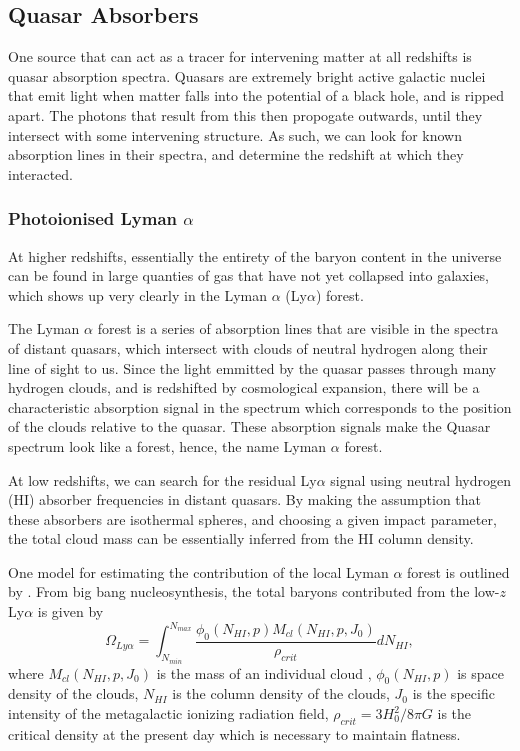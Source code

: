 \subsection{Quasar Absorbers}
One source that can act as a tracer for intervening matter at all redshifts is quasar absorption spectra. Quasars are extremely bright active galactic nuclei that emit light when matter falls into the potential of a black hole, and is ripped apart. The photons that result from this then propogate outwards, until they intersect with some intervening structure. As such, we can look for known absorption lines in their spectra, and determine the redshift at which they interacted.
\subsubsection{Photoionised Lyman $\alpha$}
At higher redshifts, essentially the entirety of the baryon content in the universe can be found in large quanties of gas that have not yet collapsed into galaxies, which shows up very clearly in the Lyman $\alpha$ (Ly$\alpha$) forest. 
\par The Lyman $\alpha$ forest is a series of absorption lines that are visible in the spectra of distant quasars, which intersect with clouds of neutral hydrogen along their line of sight to us. Since the light emmitted by the quasar passes through many hydrogen clouds, and is redshifted by cosmological expansion, there will be a characteristic absorption signal in the spectrum which corresponds to the position of the clouds relative to the quasar. These absorption signals make the Quasar spectrum look like a forest, hence, the name Lyman $\alpha$ forest. 

\par At low redshifts, we can search for the residual Ly$\alpha$ signal using neutral hydrogen (HI) absorber frequencies in distant quasars. By making the assumption that these absorbers are isothermal spheres, and choosing a given impact parameter, the total cloud mass can be essentially inferred from the HI column density. 

\par One model for estimating the contribution of the local Lyman $\alpha$ forest is outlined by \cite{2000ApJ...544..150P}. From big bang nucleosynthesis, the total baryons contributed from the low-$z$ Ly$\alpha$ is given by 
$$\Omega_{Ly\alpha} = \int_{N_{min}}^{N_{max}} \frac{ \phi_0(N_{HI},p) M_{cl}(N_{HI}, p, J_0)}{\rho_{crit}} dN_{HI} ,$$
where $M_{cl}(N_{HI}, p, J_0)$ is the mass of an individual cloud , $\phi_0(N_{HI},p)$ is space density of the clouds, $N_{HI}$ is the column density of the clouds, $J_0$ is the specific intensity of the metagalactic ionizing radiation field, $\rho_{crit} = 3 H_0^2/8 \pi G $ is the critical density at the present day which is necessary to maintain flatness.

